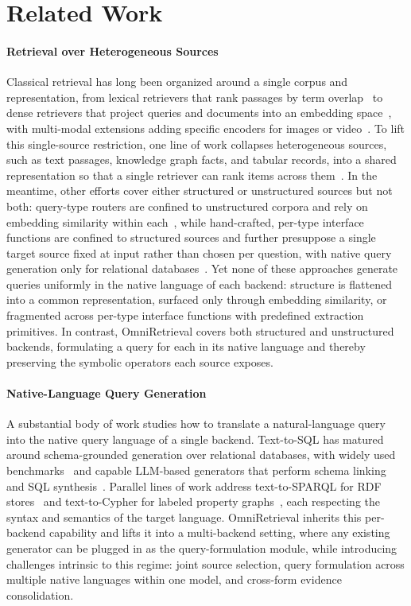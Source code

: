 \section{Related Work}

\paragraph{Retrieval over Heterogeneous Sources}
Classical retrieval has long been organized around a single corpus and representation, from lexical retrievers that rank passages by term overlap~\citep{BM25, tfidf} to dense retrievers that project queries and documents into an embedding space~\citep{DPR, ANCE}, with multi-modal extensions adding specific encoders for images or video~\citep{CLIP, VideoRAG}. To lift this single-source restriction, one line of work collapses heterogeneous sources, such as text passages, knowledge graph facts, and tabular records, into a shared representation so that a single retriever can rank items across them~\citep{UniK, UDT, DiFaR}. In the meantime, other efforts cover either structured or unstructured sources but not both: query-type routers are confined to unstructured corpora and rely on embedding similarity within each~\citep{UniversalRAG}, while hand-crafted, per-type interface functions are confined to structured sources and further presuppose a single target source fixed at input rather than chosen per question, with native query generation only for relational databases~\citep{StructGPT}. Yet none of these approaches generate queries uniformly in the native language of each backend: structure is flattened into a common representation, surfaced only through embedding similarity, or fragmented across per-type interface functions with predefined extraction primitives. In contrast, OmniRetrieval covers both structured and unstructured backends, formulating a query for each in its native language and thereby preserving the symbolic operators each source exposes.

\paragraph{Native-Language Query Generation}
A substantial body of work studies how to translate a natural-language query into the native query language of a single backend. Text-to-SQL has matured around schema-grounded generation over relational databases, with widely used benchmarks~\citep{Spider, Bird} and capable LLM-based generators that perform schema linking and SQL synthesis~\citep{Text2SQL-LLM1, Text2SQL-LLM2}. Parallel lines of work address text-to-SPARQL for RDF stores~\citep{SP-LLM1, SP-LLM2, Text2SPARQL} and text-to-Cypher for labeled property graphs~\citep{GPT4Graph, Text2Cypher}, each respecting the syntax and semantics of the target language. OmniRetrieval inherits this per-backend capability and lifts it into a multi-backend setting, where any existing generator can be plugged in as the query-formulation module, while introducing challenges intrinsic to this regime: joint source selection, query formulation across multiple native languages within one model, and cross-form evidence consolidation.

